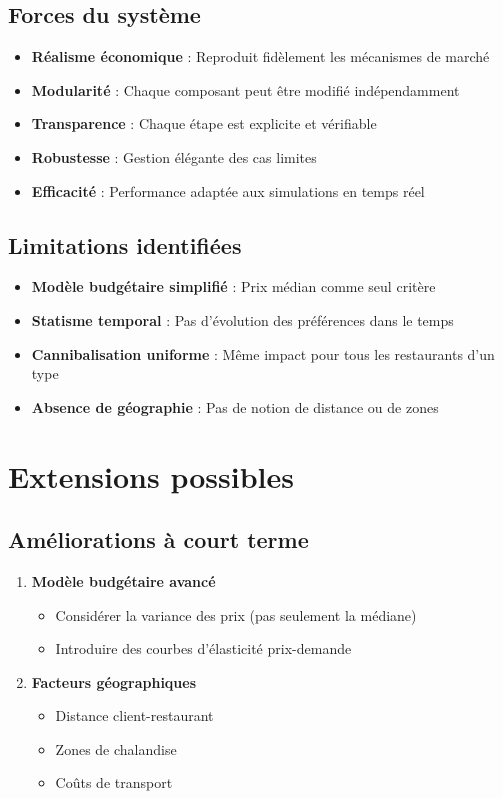 \documentclass[12pt,a4paper]{article}
\begin{document}
\subsection{Forces du système}

\begin{itemize}
    \item \textbf{Réalisme économique} : Reproduit fidèlement les mécanismes de marché
    \item \textbf{Modularité} : Chaque composant peut être modifié indépendamment
    \item \textbf{Transparence} : Chaque étape est explicite et vérifiable
    \item \textbf{Robustesse} : Gestion élégante des cas limites
    \item \textbf{Efficacité} : Performance adaptée aux simulations en temps réel
\end{itemize}

\subsection{Limitations identifiées}

\begin{itemize}
    \item \textbf{Modèle budgétaire simplifié} : Prix médian comme seul critère
    \item \textbf{Statisme temporal} : Pas d'évolution des préférences dans le temps
    \item \textbf{Cannibalisation uniforme} : Même impact pour tous les restaurants d'un type
    \item \textbf{Absence de géographie} : Pas de notion de distance ou de zones
\end{itemize}

\section{Extensions possibles}

\subsection{Améliorations à court terme}

\begin{enumerate}
    \item \textbf{Modèle budgétaire avancé}
    \begin{itemize}
        \item Considérer la variance des prix (pas seulement la médiane)
        \item Introduire des courbes d'élasticité prix-demande
    \end{itemize}

    \item \textbf{Facteurs géographiques}
    \begin{itemize}
        \item Distance client-restaurant
        \item Zones de chalandise
        \item Coûts de transport
    \end{itemize}
\end{enumerate}
\end{document}
